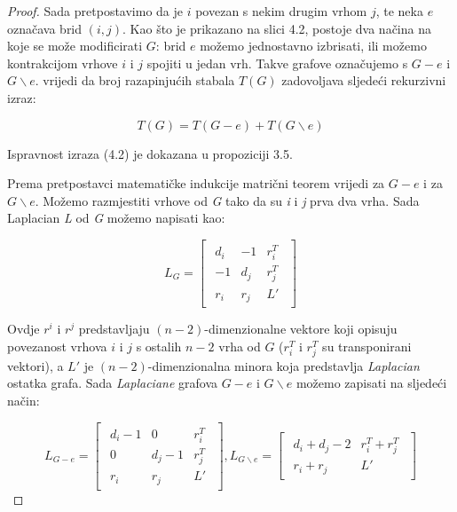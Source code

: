 \documentclass[times, utf8, zavrsni]{fer}
\begin{document}
\begin{proof}
Sada pretpostavimo da je $i$ povezan s nekim drugim vrhom $j$, te neka $e$ označava brid $(i,j)$. Kao što je prikazano na slici 4.2, postoje dva načina na koje se može modificirati $G$: brid $e$ možemo jednostavno izbrisati, ili možemo kontrakcijom vrhove $i$ i $j$ spojiti u jedan vrh. Takve grafove označujemo s $G - e$ i $G \backslash e$. vrijedi da broj razapinjućih stabala $T(G)$ zadovoljava sljedeći rekurzivni izraz:

\begin{equation}
	T(G) = T(G - e) + T(G \backslash e)
\end{equation}

Ispravnost izraza (4.2) je dokazana u propoziciji 3.5.

Prema pretpostavci matematičke indukcije matrični teorem vrijedi za $G - e$ i za $G \backslash e$. Možemo razmjestiti vrhove od \textit{G} tako da su \textit{i} i \textit{j} prva dva vrha. Sada Laplacian \textit{L} od \textit{G} možemo napisati kao:

\[
L_G =
\begin{bmatrix}
	\begin{array}{c|c|c}
		d_i & -1 & r_i^T \\
		\hline
		-1 & d_j & r_j^T \\
		\hline
		r_i & r_j & L'
	\end{array}
\end{bmatrix}
\]

Ovdje $r^i$ i $r^j$ predstavljaju $(n - 2)$-dimenzionalne vektore koji opisuju povezanost vrhova $i$ i $j$ s ostalih $n - 2$ vrha od $G$ ($r_i^T$ i $r_j^T$ su transponirani vektori), a $L'$ je $(n - 2)$-dimenzionalna minora koja predstavlja \textit{Laplacian} ostatka grafa. Sada \textit{Laplaciane} grafova $G - e$ i $G \backslash e$ možemo zapisati na sljedeći način:

\[
L_{G - e} = 
\begin{bmatrix}
	\begin{array}{c|c|c}
		d_i - 1 & 0 & r_i^T \\
		\hline
		0 & d_j - 1 & r_j^T \\
		\hline
		r_i & r_j & L'
	\end{array}
\end{bmatrix},
L_{G \backslash e} = 
\begin{bmatrix}
	\begin{array}{c|c}
		d_i + d_j - 2 & r_i^T + r_j^T \\
		\hline
		r_i + r_j & L'
	\end{array}
\end{bmatrix}
\]


\end{proof}
\end{document}

